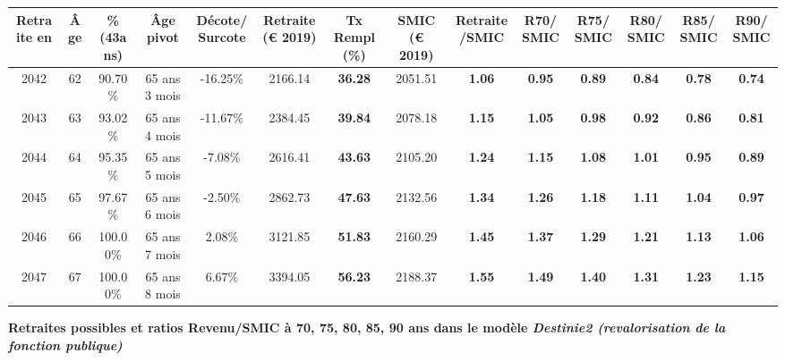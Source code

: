 \begin{adjustbox}{max width=\textwidth} 
\begin{tabular}[htb]{|c|c||c|c|c||c|c||c|c||c|c|c|c|c|} 
\hline 
 Retraite en &  Âge &  \%(43ans) &  Âge pivot &  Décote/Surcote &  Retraite (\euro{} 2019) &  Tx Rempl(\%) &  SMIC (\euro{} 2019) &  Retraite/SMIC &  R70/SMIC &  R75/SMIC &  R80/SMIC &  R85/SMIC &  R90/SMIC \\ 
\hline \hline 
 2042 &  62 &  90.70\% &  65 ans 3 mois &  -16.25\% &  2166.14 &  {\bf 36.28} &  2051.51 &  {\bf 1.06} &  {\bf {\color{red} 0.95}} &  {\bf {\color{red} 0.89}} &  {\bf {\color{red} 0.84}} &  {\bf {\color{red} 0.78}} &  {\bf {\color{red} 0.74}} \\ 
\hline 
 2043 &  63 &  93.02\% &  65 ans 4 mois &  -11.67\% &  2384.45 &  {\bf 39.84} &  2078.18 &  {\bf 1.15} &  {\bf 1.05} &  {\bf {\color{red} 0.98}} &  {\bf {\color{red} 0.92}} &  {\bf {\color{red} 0.86}} &  {\bf {\color{red} 0.81}} \\ 
\hline 
 2044 &  64 &  95.35\% &  65 ans 5 mois &  -7.08\% &  2616.41 &  {\bf 43.63} &  2105.20 &  {\bf 1.24} &  {\bf 1.15} &  {\bf 1.08} &  {\bf 1.01} &  {\bf {\color{red} 0.95}} &  {\bf {\color{red} 0.89}} \\ 
\hline 
 2045 &  65 &  97.67\% &  65 ans 6 mois &  -2.50\% &  2862.73 &  {\bf 47.63} &  2132.56 &  {\bf 1.34} &  {\bf 1.26} &  {\bf 1.18} &  {\bf 1.11} &  {\bf 1.04} &  {\bf {\color{red} 0.97}} \\ 
\hline 
 2046 &  66 &  100.00\% &  65 ans 7 mois &  2.08\% &  3121.85 &  {\bf 51.83} &  2160.29 &  {\bf 1.45} &  {\bf 1.37} &  {\bf 1.29} &  {\bf 1.21} &  {\bf 1.13} &  {\bf 1.06} \\ 
\hline 
 2047 &  67 &  100.00\% &  65 ans 8 mois &  6.67\% &  3394.05 &  {\bf 56.23} &  2188.37 &  {\bf 1.55} &  {\bf 1.49} &  {\bf 1.40} &  {\bf 1.31} &  {\bf 1.23} &  {\bf 1.15} \\ 
\hline 
\hline 
\end{tabular} 
\end{adjustbox} 
 
 \vspace{0.1cm} 
{\bf \noindent Retraites possibles et ratios Revenu/SMIC à 70, 75, 80, 85, 90 ans dans le modèle \emph{Destinie2 (revalorisation de la fonction publique)}}  
 
